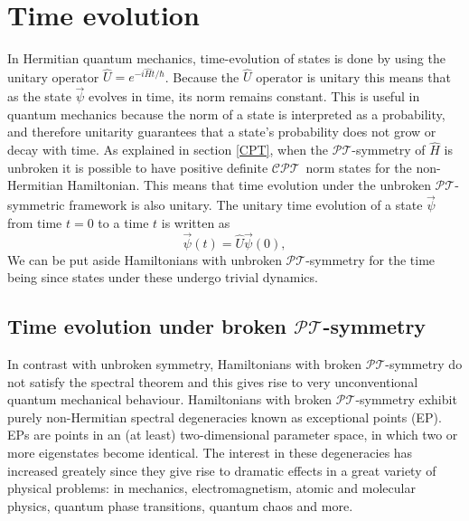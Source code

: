 \documentclass[12pt, a4paper]{report}
\newcommand\PT{\(\mathcal{PT}\)}
\newcommand\CPT{\(\mathcal{CPT}\)}
\begin{document}
\chapter{Time evolution}\label{Tev}
In Hermitian quantum mechanics, time-evolution of states is done by using the unitary operator $\hat{U} = e^{-i\hat{H}t/\hbar}$. Because the $\hat{U}$ operator is unitary this means that as the state $\vec{\psi}$ evolves in time, its norm remains constant. This is useful in quantum mechanics because the norm of a state is interpreted as a probability, and therefore unitarity guarantees that a state's probability does not grow or decay with time. As explained in section \ref{CPT}, when the \PT-symmetry of $\hat{H}$ is unbroken it is possible to have positive definite \CPT norm states for the non-Hermitian Hamiltonian. This means that time evolution under the unbroken \PT-symmetric framework is also unitary\cite{Jones-Smith}\cite{ComplexExtension}\cite{Mostafazadeh2}. 
The unitary time evolution of a state $\vec{\psi}$ from time $t = 0$ to a time $t$ is written as
\begin{equation}\label{eq:3.1}
\vec{\psi}(t) = \hat{U} \vec{\psi}(0),
\end{equation}
We can be put aside Hamiltonians with unbroken \PT-symmetry for the time being since states under these undergo trivial dynamics.

\section{Time evolution under broken \PT-symmetry}
In contrast with unbroken symmetry, Hamiltonians with broken \PT-symmetry do not satisfy the spectral theorem and this gives rise to very unconventional quantum mechanical behaviour. Hamiltonians with broken \PT-symmetry exhibit purely non-Hermitian spectral degeneracies known as exceptional points (EP)\cite{Bossart}. EPs are points in an (at least) two-dimensional parameter space, in which two or more eigenstates become identical\cite{Moiseyev}\cite{Cartarius}. 
The interest in these degeneracies has increased greately since they give rise to dramatic effects in a great variety of physical problems: in mechanics, electromagnetism, atomic and molecular physics, quantum phase transitions, quantum chaos and more\cite{Heiss_2012}.
\end{document}
